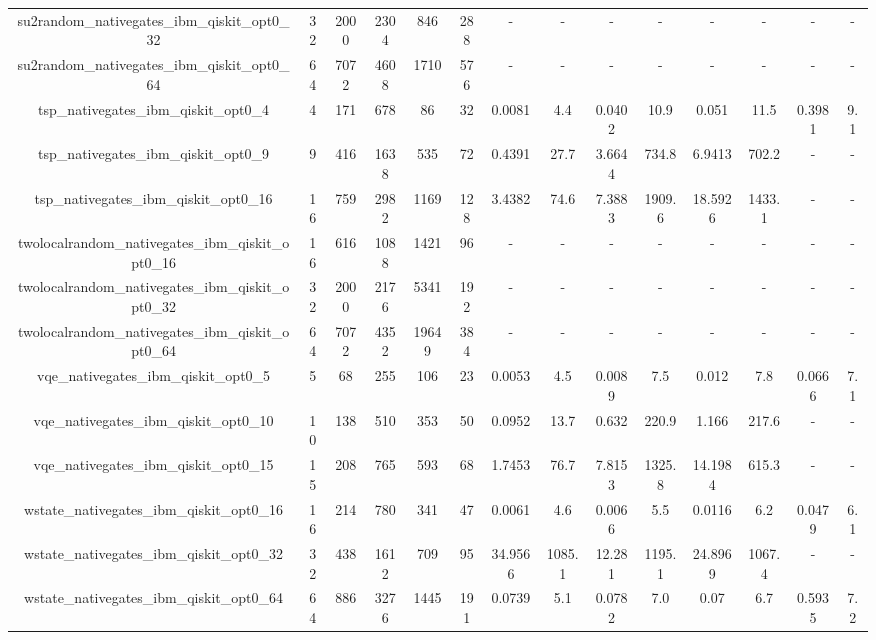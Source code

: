 \begin{table}[htb]
{\begin{tabular}{|c|c|c|c|c|c|c|c|c|c|c|c|c|c|}
su2random\_nativegates\_ibm\_qiskit\_opt0\_32 & 32 & 2000 & 2304 & 846 & 288 & - & - & - & - & - & - & - & - \\ 
su2random\_nativegates\_ibm\_qiskit\_opt0\_64 & 64 & 7072 & 4608 & 1710 & 576 & - & - & - & - & - & - & - & - \\ 
tsp\_nativegates\_ibm\_qiskit\_opt0\_4 & 4 & 171 & 678 & 86 & 32 & 0.0081 & 4.4 & 0.0402 & 10.9 & 0.051 & 11.5 & 0.3981 & 9.1 \\ 
tsp\_nativegates\_ibm\_qiskit\_opt0\_9 & 9 & 416 & 1638 & 535 & 72 & 0.4391 & 27.7 & 3.6644 & 734.8 & 6.9413 & 702.2 & - & - \\ 
tsp\_nativegates\_ibm\_qiskit\_opt0\_16 & 16 & 759 & 2982 & 1169 & 128 & 3.4382 & 74.6 & 7.3883 & 1909.6 & 18.5926 & 1433.1 & - & - \\ 
twolocalrandom\_nativegates\_ibm\_qiskit\_opt0\_16 & 16 & 616 & 1088 & 1421 & 96 & - & - & - & - & - & - & - & - \\ 
twolocalrandom\_nativegates\_ibm\_qiskit\_opt0\_32 & 32 & 2000 & 2176 & 5341 & 192 & - & - & - & - & - & - & - & - \\ 
twolocalrandom\_nativegates\_ibm\_qiskit\_opt0\_64 & 64 & 7072 & 4352 & 19649 & 384 & - & - & - & - & - & - & - & - \\ 
vqe\_nativegates\_ibm\_qiskit\_opt0\_5 & 5 & 68 & 255 & 106 & 23 & 0.0053 & 4.5 & 0.0089 & 7.5 & 0.012 & 7.8 & 0.0666 & 7.1 \\ 
vqe\_nativegates\_ibm\_qiskit\_opt0\_10 & 10 & 138 & 510 & 353 & 50 & 0.0952 & 13.7 & 0.632 & 220.9 & 1.166 & 217.6 & - & - \\ 
vqe\_nativegates\_ibm\_qiskit\_opt0\_15 & 15 & 208 & 765 & 593 & 68 & 1.7453 & 76.7 & 7.8153 & 1325.8 & 14.1984 & 615.3 & - & - \\ 
wstate\_nativegates\_ibm\_qiskit\_opt0\_16 & 16 & 214 & 780 & 341 & 47 & 0.0061 & 4.6 & 0.0066 & 5.5 & 0.0116 & 6.2 & 0.0479 & 6.1 \\ 
wstate\_nativegates\_ibm\_qiskit\_opt0\_32 & 32 & 438 & 1612 & 709 & 95 & 34.9566 & 1085.1 & 12.281 & 1195.1 & 24.8969 & 1067.4 & - & - \\ 
wstate\_nativegates\_ibm\_qiskit\_opt0\_64 & 64 & 886 & 3276 & 1445 & 191 & 0.0739 & 5.1 & 0.0782 & 7.0 & 0.07 & 6.7 & 0.5935 & 7.2 \\ 
\hline 
\end{tabular}} 
\end{table} 
